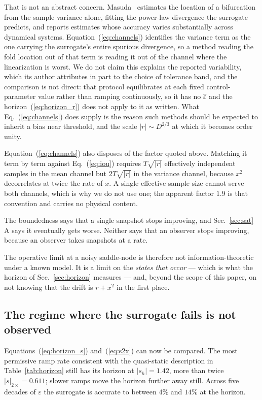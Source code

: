 \documentclass[%
 aip,
 cha,
 amsmath,amssymb,
 reprint,
 superscriptaddress,
 floatfix,
]{revtex4-2}
\newcommand{\Sig}{\hat\varepsilon}
\begin{document}
That is not an abstract concern.  Masuda~\cite{Masuda2026} estimates the location of a bifurcation from the sample variance alone, fitting the power-law divergence the surrogate predicts, and reports estimates whose accuracy varies substantially across dynamical systems.  Equation~(\ref{eq:channels}) identifies the variance term as the one carrying the surrogate's entire spurious divergence, so a method reading the fold location out of that term is reading it out of the channel where the linearization is worst.  We do not claim this explains the reported variability, which its author attributes in part to the choice of tolerance band, and the comparison is not direct: that protocol equilibrates at each fixed control-parameter value rather than ramping continuously, so it has no $\Sig$ and the horizon~(\ref{eq:horizon_r}) does not apply to it as written.  What Eq.~(\ref{eq:channels}) does supply is the reason such methods should be expected to inherit a bias near threshold, and the scale $|r|\sim D^{2/3}$ at which it becomes order unity.

Equation~(\ref{eq:channels}) also disposes of the factor quoted above.  Matching it term by term against Eq.~(\ref{eq:iou}) requires $T\sqrt{|r|}$ effectively independent samples in the mean channel but $2T\sqrt{|r|}$ in the variance channel, because $x^2$ decorrelates at twice the rate of $x$.  A single effective sample size cannot serve both channels, which is why we do not use one; the apparent factor $1.9$ is that convention and carries no physical content.

The boundedness says that a single snapshot stops improving, and Sec.~\ref{sec:sat}\,A says it eventually gets worse.  Neither says that an observer stops improving, because an observer takes snapshots at a rate.

The operative limit at a noisy saddle-node is therefore not information-theoretic under a known model.  It is a limit on the \emph{states that occur} --- which is what the horizon of Sec.~\ref{sec:horizon} measures --- and, beyond the scope of this paper, on not knowing that the drift is $r+x^2$ in the first place.

\subsection{The regime where the surrogate fails is not observed}

Equations~(\ref{eq:horizon_s}) and~(\ref{eq:s2x}) can now be compared.  The most permissive ramp rate consistent with the quasi-static description in Table~\ref{tab:horizon} still has its horizon at $|s_h|=1.42$, more than twice $|s|_{2\times}=0.611$; slower ramps move the horizon further away still.  Across five decades of $\varepsilon$ the surrogate is accurate to between $4\%$ and $14\%$ at the horizon.
\end{document}
